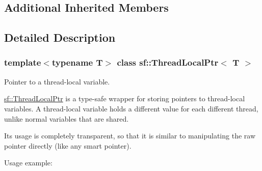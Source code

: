 \subsection*{Additional Inherited Members}


\subsection{Detailed Description}
\subsubsection*{template$<$typename T$>$\newline
class sf\+::\+Thread\+Local\+Ptr$<$ T $>$}

Pointer to a thread-\/local variable. 

\begin{DoxyVerb}\end{DoxyVerb}


\mbox{\hyperlink{classsf_1_1_thread_local_ptr}{sf\+::\+Thread\+Local\+Ptr}} is a type-\/safe wrapper for storing pointers to thread-\/local variables. A thread-\/local variable holds a different value for each different thread, unlike normal variables that are shared.

Its usage is completely transparent, so that it is similar to manipulating the raw pointer directly (like any smart pointer).

Usage example\+: 
\begin{DoxyCode}{0}
\DoxyCodeLine{}
\DoxyCodeLine{\{}
\DoxyCodeLine{\}}
\DoxyCodeLine{}
\DoxyCodeLine{\{}
\DoxyCodeLine{\}}
\DoxyCodeLine{}
\DoxyCodeLine{\{}
\DoxyCodeLine{    \textcolor{comment}{// Create and launch the two threads}}
\DoxyCodeLine{}
\DoxyCodeLine{\}}
\end{DoxyCode}


